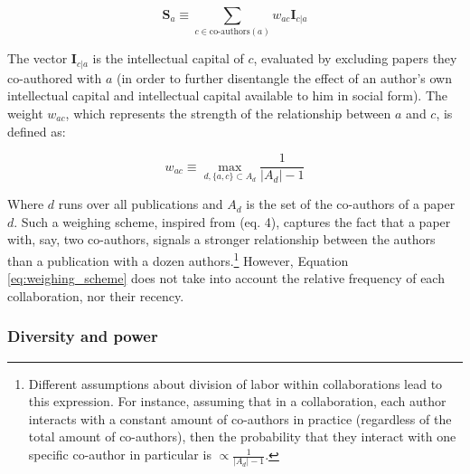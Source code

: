 \documentclass{article}
\begin{document}
\begin{equation}
    \bm{S}_{a} \equiv \sum_{c \in \text{co-authors}(a)} w_{ac} \bm{I}_{c|a}
\end{equation}

The vector $\bm{I}_{c|a}$ is the intellectual capital of $c$, evaluated by excluding papers they co-authored with $a$ (in order to further disentangle the effect of an author's own intellectual capital and intellectual capital available to him in social form). The weight $w_{ac}$, which represents the strength of the relationship between $a$ and $c$, is defined as:

\begin{equation}
    w_{ac} \equiv \max_{d, \{a,c\} \subset A_d} \frac{1}{|A_d|-1}
    \label{eq:weighing_scheme}
\end{equation}

Where $d$ runs over all publications and $A_d$ is the set of the co-authors of a paper $d$. Such a weighing scheme, inspired from \citealt{Newman2004} (eq. 4), captures the fact that a paper with, say, two co-authors, signals a stronger relationship between the authors than a publication with a dozen authors.\footnote{Different assumptions about division of labor within collaborations lead to this expression. For instance, assuming that in a collaboration, each author interacts with a constant amount of co-authors in practice (regardless of the total amount of co-authors), then the probability that they interact with one specific co-author in particular is $\propto \frac{1}{|A_d|-1}$. 
} However, Equation \eqref{eq:weighing_scheme} does not take into account the relative frequency of each collaboration, nor their recency.

\subsubsection{Diversity and power}
\end{document}
